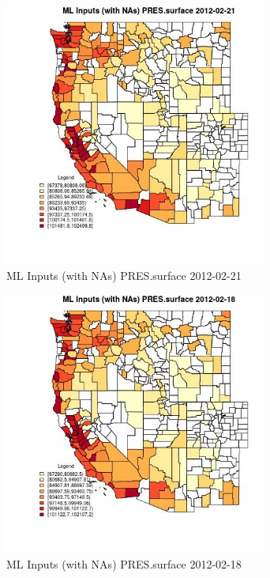 \begin{figure} 
\centering  
\includegraphics[width=0.77\textwidth]{Code_Outputs/Report_ML_input_PM25_Step4_part_f_de_duplicated_aves_prioritize_24hr_obswNAs_CountyPRESsurfaceMean2012-02-21.jpg} 
\caption{\label{fig:Report_ML_input_PM25_Step4_part_f_de_duplicated_aves_prioritize_24hr_obswNAsCountyPRESsurfaceMean2012-02-21}ML Inputs (with NAs) PRES.surface 2012-02-21} 
\end{figure} 
 

\begin{figure} 
\centering  
\includegraphics[width=0.77\textwidth]{Code_Outputs/Report_ML_input_PM25_Step4_part_f_de_duplicated_aves_prioritize_24hr_obswNAs_CountyPRESsurfaceMean2012-02-18.jpg} 
\caption{\label{fig:Report_ML_input_PM25_Step4_part_f_de_duplicated_aves_prioritize_24hr_obswNAsCountyPRESsurfaceMean2012-02-18}ML Inputs (with NAs) PRES.surface 2012-02-18} 
\end{figure} 
 

